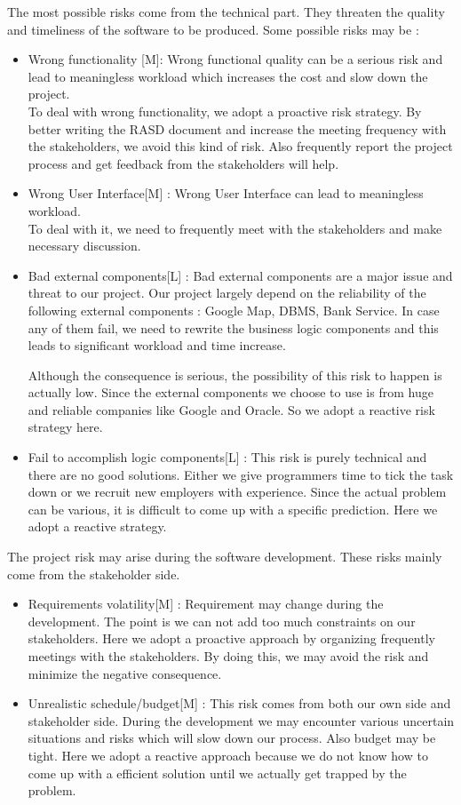 \documentclass{article}
\begin{document}
The most possible risks come from the technical part. They threaten the quality and timeliness of the software to be produced. Some possible risks may be :
\begin{itemize}
	\item Wrong functionality [M]: Wrong functional quality can be a serious risk and lead to meaningless workload which increases the cost and slow down the project.\\
	To deal with wrong functionality, we adopt a proactive risk strategy. By better writing the RASD document and increase the meeting frequency with the stakeholders, we avoid this kind of risk. Also frequently report the project process and get feedback  from the stakeholders will help. 
	
	\item Wrong User Interface[M] : Wrong User Interface can lead to meaningless workload. \\
	To deal with it, we need to frequently meet with the stakeholders and make necessary discussion.
	
	\item Bad external components[L] : Bad external components are a major issue and threat to our project. Our project largely depend on the reliability of the following external components : Google Map, DBMS, Bank Service. In case any of them fail, we need to rewrite the business logic components and this leads to significant workload and time increase.
	
	Although the consequence is serious, the possibility of this risk to happen is actually low. Since the external components we choose to use is from huge and reliable companies like Google and Oracle. So we adopt a reactive risk strategy here. 
	
	\item Fail to accomplish logic components[L] : This risk is purely technical and there are no good solutions. Either we give programmers time to tick the task down or we recruit new employers with experience. Since the actual problem can be various, it is difficult to come up with a specific  prediction. Here we adopt a reactive strategy.
\end{itemize}

The project risk may arise during the software development. These risks mainly come from the stakeholder side.
\begin{itemize}
	\item Requirements volatility[M] : Requirement may change during the development. The point is we can not add too much constraints on our stakeholders. Here we adopt a proactive approach by organizing frequently meetings with the stakeholders. By doing this, we may avoid the risk and  minimize the negative consequence.
	\item Unrealistic schedule/budget[M] : This risk comes from both our own side and stakeholder side. During the development we may encounter various uncertain situations and risks which will slow down our process. Also budget may be tight. Here we adopt a reactive approach because we do not know how to come up with a efficient solution until we actually get trapped by the problem.
\end{itemize}
\end{document}

